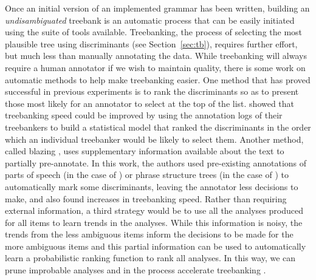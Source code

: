 Once an initial version of an implemented grammar has been written, building an
\textit{undisambiguated} treebank is an automatic process that can be easily
initiated using the suite of tools available. Treebanking, the process of
selecting the most plausible tree using discriminants (see
Section~\ref{sec:tb}), requires further effort, but much less than manually
annotating the data. 
While treebanking will always require a human annotator if we wish to
maintain quality, there is some work on automatic methods to help make
treebanking easier.  One method that has proved successful in previous
experiments is to rank the discriminants so as to present those most
likely for an annotator to select at the top of the
list.  showed that treebanking speed could be
improved by using the annotation logs of their treebankers to build a
statistical model that ranked the discriminants in the order which an
individual treebanker would be likely to select them. Another method,
called blazing \citep{Tan:Bon:Oep:Fuj:05,MacKinlay+:2011b}, uses
supplementary information available about the text to partially
pre-annotate. In this work, the authors used pre-existing annotations of
parts of speech (in the case of ) or phrase
structure trees (in the case of ) to
automatically mark some discriminants, leaving the annotator less
decisions to make, and also found increases in treebanking speed.  Rather
than requiring external information, a third strategy would be to use
all the analyses produced for all items to learn trends in the
analyses. While this information is noisy, the trends from the less
ambiguous items inform the decisions to be made for the more ambiguous
items and this partial information can be used to automatically learn a
probabilistic ranking function to rank all analyses. In this way, we can
prune improbable analyses and in the process accelerate treebanking
\citep{Dridan:Baldwin:2010}.




